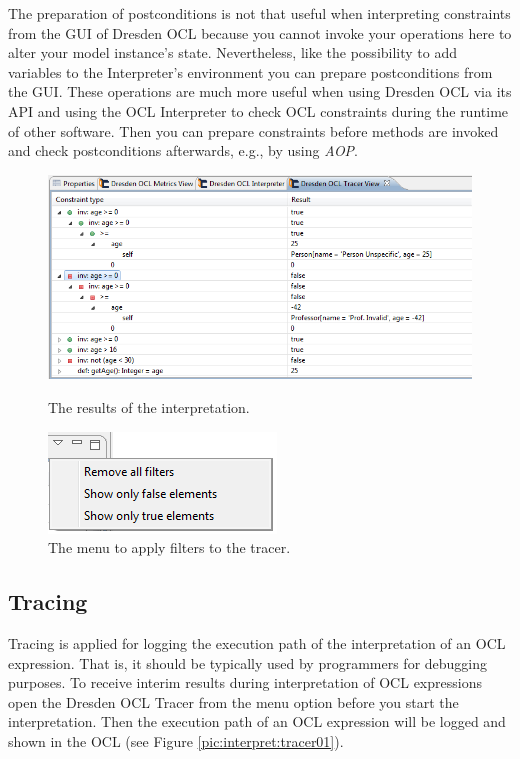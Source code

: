 The preparation of postconditions is not that useful when interpreting 
constraints from the GUI of Dresden OCL because you cannot invoke your 
operations here to alter your model instance's state. Nevertheless, like the 
possibility to add variables to the Interpreter's environment you can prepare 
postconditions from the GUI. These operations are much more useful when using 
Dresden OCL via its API and using the \acs{OCL} Interpreter to check \acs{OCL} 
constraints during the runtime of other software. Then you can prepare
constraints before methods are invoked and check postconditions afterwards, 
e.g., by using \emph{\acf{AOP}}.

\begin{figure}[h]
	\centering
	\includegraphics[width=1.0\linewidth]{figures/interpreter/tracer01.png}
	\caption{The results of the interpretation.}
	\label{pic:interpret:tracer01}

	\vspace{3.0em}	
	
	\centering
	\includegraphics[scale=1]{figures/interpreter/tracer02.png}
	\caption{The menu to apply filters to the tracer.}
	\label{pic:interpret:tracer02}
\end{figure}

\subsection{Tracing}

Tracing is applied for logging the execution path of the interpretation of an \acs{OCL} expression.
That is, it should be typically used by programmers for debugging purposes. To receive interim results during interpretation of \acs{OCL} expressions open the Dresden \acs{OCL} Tracer from the menu option  before you start the interpretation. Then the execution path of an \acs{OCL} expression will be logged and shown in the \acs{OCL}  (see Figure \ref{pic:interpret:tracer01}).

